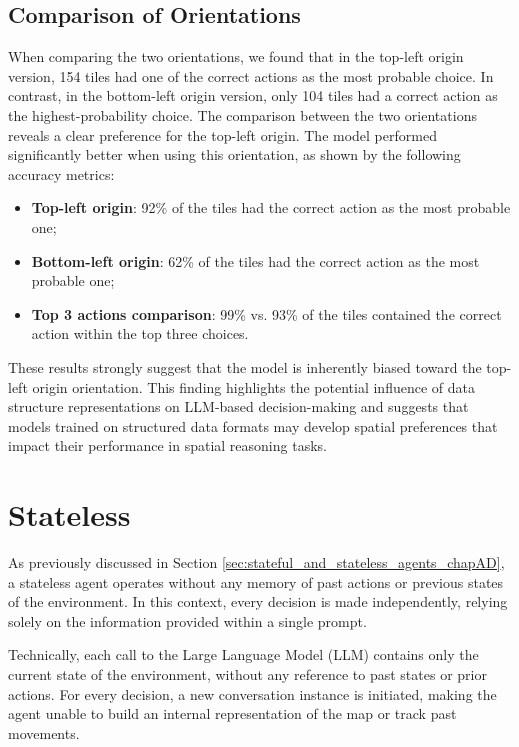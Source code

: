 \subsection{Comparison of Orientations}

When comparing the two orientations, we found that in the top-left origin
version, 154 tiles had one of the correct actions as the most probable choice.
In contrast, in the bottom-left origin version, only 104 tiles had a correct
action as the highest-probability choice. The comparison between the two orientations
reveals a clear preference for the top-left origin. The model performed
significantly better when using this orientation, as shown by the following accuracy
metrics:
\begin{itemize}
  \item \textbf{Top-left origin}: 92\% of the tiles had the correct action as
    the most probable one;

  \item \textbf{Bottom-left origin}: 62\% of the tiles had the correct action as
    the most probable one;

  \item \textbf{Top 3 actions comparison}: 99\% vs. 93\% of the tiles contained
    the correct action within the top three choices.
\end{itemize}

These results strongly suggest that the model is inherently biased toward the top-left
origin orientation. This finding highlights the potential influence of data
structure representations on LLM-based decision-making and suggests that models
trained on structured data formats may develop spatial preferences that impact
their performance in spatial reasoning tasks.

\section{Stateless}
\label{sec:stateless}

As previously discussed in Section \ref{sec:stateful_and_stateless_agents_chapAD},
a stateless agent operates without any memory of past actions or previous states
of the environment. In this context, every decision is made independently, relying
solely on the information provided within a single prompt.

Technically, each call to the Large Language Model (LLM) contains only the
current state of the environment, without any reference to past states or prior actions.
For every decision, a new conversation instance is initiated, making the agent
unable to build an internal representation of the map or track past movements.

